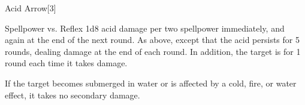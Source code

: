 \begin{spellsection}{Acid Arrow}[3]
    \begin{spellheader}
    \end{spellheader}
    \begin{spellcontent}
        \begin{spelltargetinginfo}
        \end{spelltargetinginfo}
        \begin{spelleffects}
            \begin{spellattack}{Spellpower vs. Reflex}
                \spellsuccess 1d8 acid damage per two spellpower immediately, and again at the end of the next round.
                \spellcritical As above, except that the acid persists for 5 rounds, dealing damage at the end of each round.
                In addition, the target is \sickened for 1 round each time it takes damage.
            \end{spellattack}
        \end{spelleffects}
    \end{spellcontent}
    \begin{spellfooter}
        \spellnotes If the target becomes submerged in water or is affected by a cold, fire, or water effect, it takes no secondary damage.

        \physicalspellnotes
        \miscastrandom
    \end{spellfooter}
    \begin{spellaugments}
    \end{spellaugments}
\end{spellsection}

